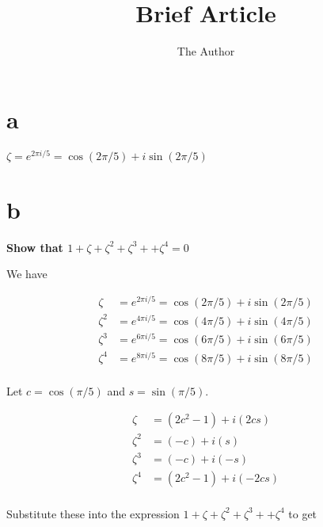 \documentclass[11pt]{amsart}
\title{Brief Article}
\author{The Author}
\begin{document}
\maketitle

\section{a}

$\zeta = e^{2 \pi i / 5} = \cos (2 \pi / 5) + i \sin( 2 \pi / 5)$

\section{b}

\textbf{
Show that $1 + \zeta + \zeta^{2} + \zeta^{3} + + \zeta^{4} = 0$
}

\vspace{1em}

We have 

$$
\begin{aligned}
\zeta &= e^{2 \pi i / 5} = \cos (2 \pi / 5) + i \sin( 2 \pi / 5) \\
\zeta^{2} &= e^{4 \pi i / 5} = \cos (4 \pi / 5) + i \sin( 4 \pi / 5) \\
\zeta^{3} &= e^{6 \pi i / 5} = \cos (6 \pi / 5) + i \sin( 6 \pi / 5) \\
\zeta^{4} &= e^{8 \pi i / 5} = \cos (8 \pi / 5) + i \sin( 8 \pi / 5) \\
\end{aligned}
$$

Let $c = \cos (\pi / 5)$ and $s = \sin (\pi / 5)$.

$$
\begin{aligned}
\zeta &=  (2 c^{2} - 1) + i (2 c s) \\
\zeta^{2} &= (-c) + i (s) \\
\zeta^{3} &= (-c) + i (-s) \\
\zeta^{4} &= (2 c^{2} - 1) + i (- 2 c s) \\
\end{aligned}
$$

Substitute these into the expression $1 + \zeta + \zeta^{2} + \zeta^{3} + + \zeta^{4}$ to get
\end{document}
